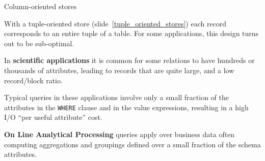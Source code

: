 %
%

%
%
%
%

%
%
\begin{frame}{Column-oriented stores}

With a tuple-oriented store (slide~\ref{tuple_oriented_stores}) each record corresponds to an entire tuple of a table. For some applications, this design turns out to be sub-optimal.

In \textbf{scientific applications} it is common for some relations to have hundreds or thousands of attributes, leading to records that are quite large, and a low record/block ratio.

Typical queries in these applications involve only a small fraction of the attributes in the \lstinline[style=SQL]{WHERE} clause and in the value expressions, resulting in a high I/O ``per useful attribute'' cost.

\textbf{On Line Analytical Processing} queries apply over business data often computing aggregations and groupings defined over a small fraction of the schema attributes.

\end{frame}

